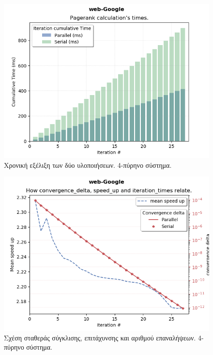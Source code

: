\begin{center}
\begin{figure}
\includegraphics[width=\linewidth]{plots/it_time.png}
\caption{Χρονική εξέλιξη των δύο υλοποιήσεων. 4-πύρηνο σύστημα.}
\end{figure}

\begin{figure}
\includegraphics[width=\linewidth]{plots/speed_up.png}
\caption{Σχέση σταθεράς σύγκλισης, επιτάχυνσης και αριθμού επαναλήψεων. 4-πύρηνο σύστημα.}
\label{fig:relat}
\end{figure}


\end{center}
